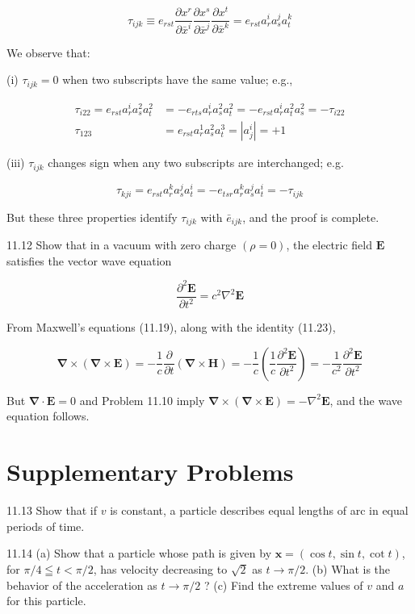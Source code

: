 \documentclass[10pt]{article}
\begin{document}
$$
\tau_{i j k} \equiv e_{r s t} \frac{\partial x^{r}}{\partial \bar{x}^{i}} \frac{\partial x^{s}}{\partial \bar{x}^{j}} \frac{\partial x^{t}}{\partial \bar{x}^{k}}=e_{r s t} a_{r}^{i} a_{s}^{j} a_{t}^{k}
$$

We observe that:

(i) $\tau_{i j k}=0$ when two subscripts have the same value; e.g.,


\begin{align*}
\tau_{i 22}=e_{r s t} a_{r}^{i} a_{s}^{2} a_{t}^{2} & =-e_{r t s} a_{r}^{i} a_{s}^{2} a_{t}^{2}=-e_{r s t} a_{r}^{i} a_{t}^{2} a_{s}^{2}=-\tau_{i 22} \\
\tau_{123} & =e_{r s t} a_{r}^{1} a_{s}^{2} a_{t}^{3}=\left|a_{j}^{i}\right|=+1 \tag{ii}
\end{align*}


(iii) $\tau_{i j k}$ changes sign when any two subscripts are interchanged; e.g.

$$
\tau_{k j i}=e_{r s t} a_{r}^{k} a_{s}^{j} a_{t}^{i}=-e_{t s r} a_{r}^{k} a_{s}^{j} a_{t}^{i}=-\tau_{i j k}
$$

But these three properties identify $\tau_{i j k}$ with $\bar{e}_{i j k}$, and the proof is complete.

11.12 Show that in a vacuum with zero charge $(\rho=0)$, the electric field $\mathbf{E}$ satisfies the vector wave equation

$$
\frac{\partial^{2} \mathbf{E}}{\partial t^{2}}=c^{2} \nabla^{2} \mathbf{E}
$$

From Maxwell's equations (11.19), along with the identity (11.23),

$$
\boldsymbol{\nabla} \times(\boldsymbol{\nabla} \times \mathbf{E})=-\frac{1}{c} \frac{\partial}{\partial t}(\boldsymbol{\nabla} \times \mathbf{H})=-\frac{1}{c}\left(\frac{1}{c} \frac{\partial^{2} \mathbf{E}}{\partial t^{2}}\right)=-\frac{1}{c^{2}} \frac{\partial^{2} \mathbf{E}}{\partial t^{2}}
$$

But $\boldsymbol{\nabla} \cdot \mathbf{E}=0$ and Problem 11.10 imply $\boldsymbol{\nabla} \times(\boldsymbol{\nabla} \times \mathbf{E})=-\nabla^{2} \mathbf{E}$, and the wave equation follows.

\section*{Supplementary Problems}
11.13 Show that if $v$ is constant, a particle describes equal lengths of arc in equal periods of time.

11.14 (a) Show that a particle whose path is given by $\mathbf{x}=(\cos t, \sin t, \cot t)$, for $\pi / 4 \leqq t<\pi / 2$, has velocity decreasing to $\sqrt{2}$ as $t \rightarrow \pi / 2$. (b) What is the behavior of the acceleration as $t \rightarrow \pi / 2$ ? (c) Find the extreme values of $v$ and $a$ for this particle.
\end{document}
